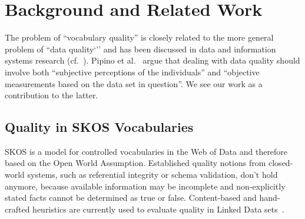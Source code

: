 
\section{Background and Related Work}\label{sec:background}

The problem of ``vocabulary quality'' is closely related to the more general problem of ``data quality`'' and has been discussed in data and information systems research (cf.~\cite{Batini2009}). Pipino et al.~\cite{Pipino2002} argue that dealing with data quality should involve both ``subjective perceptions of the individuals'' and ``objective measurements based on the data set in question''. We see our work as a contribution to the latter.

\subsection{Quality in SKOS Vocabularies}

SKOS is a model for controlled vocabularies in the Web of Data and therefore based on the Open World Assumption. Established quality notions from closed-world systems, such as referential integrity or schema validation, don't hold anymore, because available information may be incomplete and non-explicitly stated facts cannot be determined as true or false. Content-based and hand-crafted heuristics are currently used to evaluate quality in Linked Data sets~\cite{Heath2011}.





